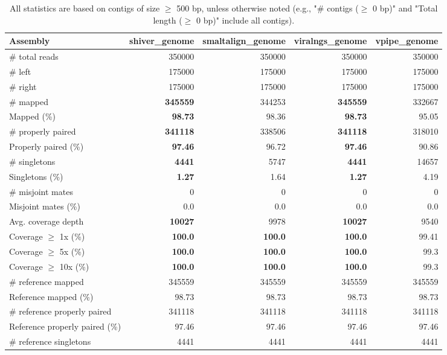 \documentclass[12pt,a4paper]{article}
\begin{document}
\begin{table}[ht]
\begin{center}
\caption{All statistics are based on contigs of size $\geq$ 500 bp, unless otherwise noted (e.g., "\# contigs ($\geq$ 0 bp)" and "Total length ($\geq$ 0 bp)" include all contigs).}
\begin{tabular}{|l*{4}{|r}|}
\hline
Assembly & shiver\_genome & smaltalign\_genome & viralngs\_genome & vpipe\_genome \\ \hline
\# total reads & 350000 & 350000 & 350000 & 350000 \\ \hline
\# left & 175000 & 175000 & 175000 & 175000 \\ \hline
\# right & 175000 & 175000 & 175000 & 175000 \\ \hline
\# mapped & {\bf 345559} & 344253 & {\bf 345559} & 332667 \\ \hline
Mapped (\%) & {\bf 98.73} & 98.36 & {\bf 98.73} & 95.05 \\ \hline
\# properly paired & {\bf 341118} & 338506 & {\bf 341118} & 318010 \\ \hline
Properly paired (\%) & {\bf 97.46} & 96.72 & {\bf 97.46} & 90.86 \\ \hline
\# singletons & {\bf 4441} & 5747 & {\bf 4441} & 14657 \\ \hline
Singletons (\%) & {\bf 1.27} & 1.64 & {\bf 1.27} & 4.19 \\ \hline
\# misjoint mates & 0 & 0 & 0 & 0 \\ \hline
Misjoint mates (\%) & 0.0 & 0.0 & 0.0 & 0.0 \\ \hline
Avg. coverage depth & {\bf 10027} & 9978 & {\bf 10027} & 9540 \\ \hline
Coverage $\geq$ 1x (\%) & {\bf 100.0} & {\bf 100.0} & {\bf 100.0} & 99.41 \\ \hline
Coverage $\geq$ 5x (\%) & {\bf 100.0} & {\bf 100.0} & {\bf 100.0} & 99.3 \\ \hline
Coverage $\geq$ 10x (\%) & {\bf 100.0} & {\bf 100.0} & {\bf 100.0} & 99.3 \\ \hline
\# reference mapped & 345559 & 345559 & 345559 & 345559 \\ \hline
Reference mapped (\%) & 98.73 & 98.73 & 98.73 & 98.73 \\ \hline
\# reference properly paired & 341118 & 341118 & 341118 & 341118 \\ \hline
Reference properly paired (\%) & 97.46 & 97.46 & 97.46 & 97.46 \\ \hline
\# reference singletons & 4441 & 4441 & 4441 & 4441 \\ \hline

\end{tabular}
\end{center}
\end{table}
\end{document}
